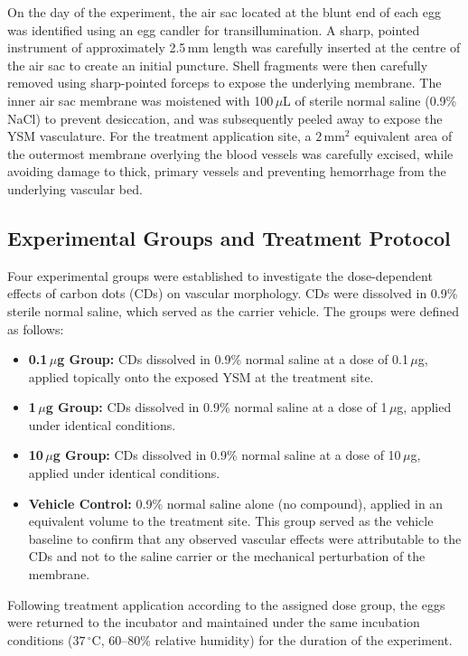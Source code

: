 On the day of the experiment, the air sac located at the blunt end of each egg was identified using an egg candler for transillumination. A sharp, pointed instrument of approximately 2.5\,mm length was carefully inserted at the centre of the air sac to create an initial puncture. Shell fragments were then carefully removed using sharp-pointed forceps to expose the underlying membrane. The inner air sac membrane was moistened with 100\,$\mu$L of sterile normal saline (0.9\% NaCl) to prevent desiccation, and was subsequently peeled away to expose the YSM vasculature. For the treatment application site, a $2\,\text{mm}^2$ equivalent area of the outermost membrane overlying the blood vessels was carefully excised, while avoiding damage to thick, primary vessels and preventing hemorrhage from the underlying vascular bed.

\subsection{Experimental Groups and Treatment Protocol}
Four experimental groups were established to investigate the dose-dependent effects of carbon dots (CDs) on vascular morphology. CDs were dissolved in 0.9\% sterile normal saline, which served as the carrier vehicle. The groups were defined as follows:
\begin{itemize}
    \item \textbf{0.1\,$\mu$g Group:} CDs dissolved in 0.9\% normal saline at a dose of 0.1\,$\mu$g, applied topically onto the exposed YSM at the treatment site.
    \item \textbf{1\,$\mu$g Group:} CDs dissolved in 0.9\% normal saline at a dose of 1\,$\mu$g, applied under identical conditions.
    \item \textbf{10\,$\mu$g Group:} CDs dissolved in 0.9\% normal saline at a dose of 10\,$\mu$g, applied under identical conditions.
    \item \textbf{Vehicle Control:} 0.9\% normal saline alone (no compound), applied in an equivalent volume to the treatment site. This group served as the vehicle baseline to confirm that any observed vascular effects were attributable to the CDs and not to the saline carrier or the mechanical perturbation of the membrane.
\end{itemize}

Following treatment application according to the assigned dose group, the eggs were returned to the incubator and maintained under the same incubation conditions ($37\,^{\circ}\text{C}$, 60--80\% relative humidity) for the duration of the experiment.

